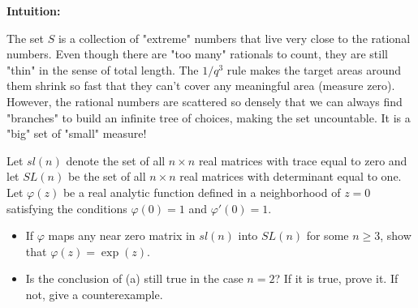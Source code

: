 \begin{solution}
\textbf{Intuition:}

The set $S$ is a collection of "extreme" numbers that live very close to the rational numbers. Even though there are "too many" rationals to count, they are still "thin" in the sense of total length. The $1/q^3$ rule makes the target areas around them shrink so fast that they can't cover any meaningful area (measure zero). However, the rational numbers are scattered so densely that we can always find "branches" to build an infinite tree of choices, making the set uncountable. It is a "big" set of "small" measure!


\end{solution}

\vspace{2em}

\begin{exercise}
\label{analysis:2011:11}
Let $sl(n)$ denote the set of all $n\times n$ real matrices with trace equal to zero and let $SL(n)$ be the set of all $n\times n$ real matrices with determinant equal to one. Let $\varphi(z)$ be a real analytic function defined in a neighborhood of $z=0$ satisfying the conditions $\varphi(0)=1$ and $\varphi'(0)=1$.
\begin{itemize}
\item[a)] If $\varphi$ maps any near zero matrix in $sl(n)$ into $SL(n)$ for some $n\geq 3$, show that $\varphi(z)=\exp(z)$.
\item[b)] Is the conclusion of (a) still true in the case $n=2$? If it is true, prove it. If not, give a counterexample.
\end{itemize}
\end{exercise}


